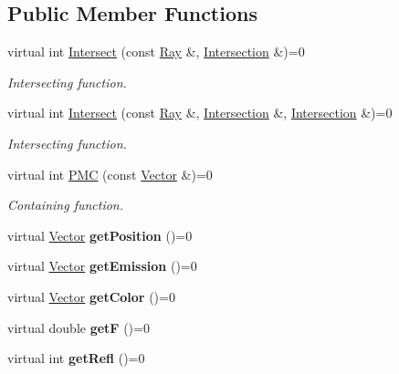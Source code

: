 \subsection*{\-Public \-Member \-Functions}
\begin{DoxyCompactItemize}
\item 
virtual int \hyperlink{class_node_ac0836475b7b0275dffe5ce89547f6852}{\-Intersect} (const \hyperlink{class_ray}{\-Ray} \&, \hyperlink{class_intersection}{\-Intersection} \&)=0
\begin{DoxyCompactList}\small\item\em \-Intersecting function. \end{DoxyCompactList}\item 
virtual int \hyperlink{class_node_a8f308647523fba2603248b83149855a5}{\-Intersect} (const \hyperlink{class_ray}{\-Ray} \&, \hyperlink{class_intersection}{\-Intersection} \&, \hyperlink{class_intersection}{\-Intersection} \&)=0
\begin{DoxyCompactList}\small\item\em \-Intersecting function. \end{DoxyCompactList}\item 
virtual int \hyperlink{class_node_aeecdf01a88be40840b65eb34cecc7a3c}{\-P\-M\-C} (const \hyperlink{class_vector}{\-Vector} \&)=0
\begin{DoxyCompactList}\small\item\em \-Containing function. \end{DoxyCompactList}\item 
\hypertarget{class_node_a3bc79b1fef701d1638b631ae384d9010}{
virtual \hyperlink{class_vector}{\-Vector} {\bfseries get\-Position} ()=0}
\label{class_node_a3bc79b1fef701d1638b631ae384d9010}

\item 
\hypertarget{class_node_ad7d3f20cd68ea44a02b0588d32cfd131}{
virtual \hyperlink{class_vector}{\-Vector} {\bfseries get\-Emission} ()=0}
\label{class_node_ad7d3f20cd68ea44a02b0588d32cfd131}

\item 
\hypertarget{class_node_aceea01792d77f81e26c83c7edc68dbe7}{
virtual \hyperlink{class_vector}{\-Vector} {\bfseries get\-Color} ()=0}
\label{class_node_aceea01792d77f81e26c83c7edc68dbe7}

\item 
\hypertarget{class_node_a1f77eb4564cc3ac5729173a48687d5b4}{
virtual double {\bfseries get\-F} ()=0}
\label{class_node_a1f77eb4564cc3ac5729173a48687d5b4}

\item 
\hypertarget{class_node_ac6efd2280f80887317b7e34b7656ac02}{
virtual int {\bfseries get\-Refl} ()=0}
\label{class_node_ac6efd2280f80887317b7e34b7656ac02}

\end{DoxyCompactItemize}


